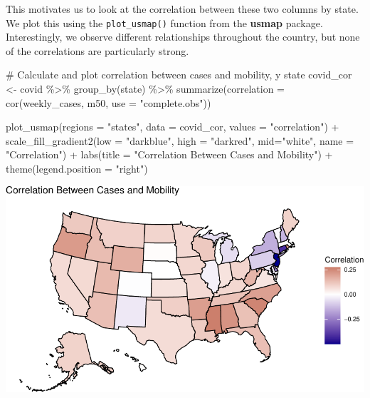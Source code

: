 \documentclass[
  letterpaper,
]{latex/krantz}
\makeatletter
\newenvironment{Shaded}{\begin{snugshade}}{\end{snugshade}}
\newcommand{\AttributeTok}[1]{\textcolor[rgb]{0.40,0.45,0.13}{#1}}
\newcommand{\CommentTok}[1]{\textcolor[rgb]{0.37,0.37,0.37}{#1}}
\newcommand{\FunctionTok}[1]{\textcolor[rgb]{0.28,0.35,0.67}{#1}}
\newcommand{\NormalTok}[1]{\textcolor[rgb]{0.00,0.23,0.31}{#1}}
\newcommand{\OtherTok}[1]{\textcolor[rgb]{0.00,0.23,0.31}{#1}}
\newcommand{\SpecialCharTok}[1]{\textcolor[rgb]{0.37,0.37,0.37}{#1}}
\newcommand{\StringTok}[1]{\textcolor[rgb]{0.13,0.47,0.30}{#1}}
\newenvironment{kframe}{%
\medskip{}
\setlength{\fboxsep}{.8em}
 \def\at@end@of@kframe{}%
 \ifinner\ifhmode%
  \def\at@end@of@kframe{\end{minipage}}%
  \begin{minipage}{\columnwidth}%
 \fi\fi%
 \def\FrameCommand##1{\hskip\@totalleftmargin \hskip-\fboxsep
 \colorbox{shadecolor}{##1}\hskip-\fboxsep
     \hskip-\linewidth \hskip-\@totalleftmargin \hskip\columnwidth}%
 \MakeFramed {\advance\hsize-\width
   \@totalleftmargin\z@ \linewidth\hsize
   \@setminipage}}%
 {\par\unskip\endMakeFramed%
 \at@end@of@kframe}
\renewenvironment{Shaded}{\begin{kframe}}{\end{kframe}}
\makeatother
\begin{document}
This motivates us to look at the correlation between these two columns
by state. We plot this using the
\texttt{plot\_usmap()}
function from the \textbf{usmap} package.
Interestingly, we observe different relationships throughout the
country, but none of the correlations are particularly strong.

\begin{Shaded}
\begin{Highlighting}[]
\CommentTok{\# Calculate and plot correlation between cases and mobility, y state}
\NormalTok{covid\_cor }\OtherTok{\textless{}{-}}\NormalTok{ covid }\SpecialCharTok{\%\textgreater{}\%}
  \FunctionTok{group\_by}\NormalTok{(state) }\SpecialCharTok{\%\textgreater{}\%}
  \FunctionTok{summarize}\NormalTok{(}\AttributeTok{correlation =} \FunctionTok{cor}\NormalTok{(weekly\_cases, m50,}
                              \AttributeTok{use =} \StringTok{"complete.obs"}\NormalTok{))}

\FunctionTok{plot\_usmap}\NormalTok{(}\AttributeTok{regions =} \StringTok{"states"}\NormalTok{, }\AttributeTok{data =}\NormalTok{ covid\_cor, }
           \AttributeTok{values =} \StringTok{"correlation"}\NormalTok{) }\SpecialCharTok{+}
  \FunctionTok{scale\_fill\_gradient2}\NormalTok{(}\AttributeTok{low =} \StringTok{"darkblue"}\NormalTok{, }\AttributeTok{high =} \StringTok{"darkred"}\NormalTok{, }
                       \AttributeTok{mid=}\StringTok{"white"}\NormalTok{, }\AttributeTok{name =} \StringTok{"Correlation"}\NormalTok{) }\SpecialCharTok{+} 
  \FunctionTok{labs}\NormalTok{(}\AttributeTok{title =} \StringTok{"Correlation Between Cases and Mobility"}\NormalTok{) }\SpecialCharTok{+}
  \FunctionTok{theme}\NormalTok{(}\AttributeTok{legend.position =} \StringTok{"right"}\NormalTok{)}
\end{Highlighting}
\end{Shaded}

\begin{center}
\includegraphics[width=1\textwidth,height=\textheight]{book/cs_eda_files/figure-pdf/unnamed-chunk-16-1.pdf}
\end{center}
\end{document}
